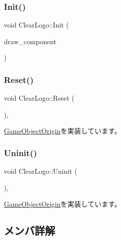 \subsubsection{\texorpdfstring{Init()}{Init()}}
{\footnotesize\ttfamily void Clear\+Logo\+::\+Init (\begin{DoxyParamCaption}\item[{\mbox{\hyperlink{class_draw_component}{Draw\+Component}} $\ast$}]{draw\+\_\+component }\end{DoxyParamCaption})}

\mbox{\label{class_clear_logo_aa19369cbace0cc79957ef7b4d4dbd0f5}} 
\subsubsection{\texorpdfstring{Reset()}{Reset()}}
{\footnotesize\ttfamily void Clear\+Logo\+::\+Reset (\begin{DoxyParamCaption}{ }\end{DoxyParamCaption})\hspace{0.3cm}{\ttfamily [override]}, {\ttfamily [virtual]}}



\mbox{\hyperlink{class_game_object_origin_af9af378a4fd9028316a6fdb461ed6a10}{Game\+Object\+Origin}}を実装しています。

\mbox{\label{class_clear_logo_ab55def116615b92a8e8cc40b364b7a4c}} 
\subsubsection{\texorpdfstring{Uninit()}{Uninit()}}
{\footnotesize\ttfamily void Clear\+Logo\+::\+Uninit (\begin{DoxyParamCaption}{ }\end{DoxyParamCaption})\hspace{0.3cm}{\ttfamily [override]}, {\ttfamily [virtual]}}



\mbox{\hyperlink{class_game_object_origin_aeac8fc4a1f625982313a9a60dd35d016}{Game\+Object\+Origin}}を実装しています。



\subsection{メンバ詳解}
\mbox{\label{class_clear_logo_ad4c1abbd7e501cc44357c9f65e12482f}} 
